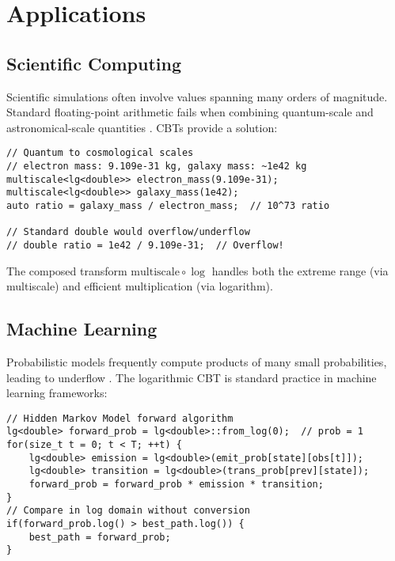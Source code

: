 \documentclass[12pt,a4paper]{article}
\theoremstyle{definition}
\begin{document}
\section{Applications}

\subsection{Scientific Computing}

Scientific simulations often involve values spanning many orders of magnitude. Standard floating-point arithmetic fails when combining quantum-scale and astronomical-scale quantities \cite{goldberg1991every}. CBTs provide a solution:

\begin{lstlisting}[caption={Multi-scale physics simulation using composed CBTs}]
// Quantum to cosmological scales  
// electron mass: 9.109e-31 kg, galaxy mass: ~1e42 kg
multiscale<lg<double>> electron_mass(9.109e-31);
multiscale<lg<double>> galaxy_mass(1e42);
auto ratio = galaxy_mass / electron_mass;  // 10^73 ratio

// Standard double would overflow/underflow
// double ratio = 1e42 / 9.109e-31;  // Overflow!
\end{lstlisting}

The composed transform $\text{multiscale} \circ \log$ handles both the extreme range (via multiscale) and efficient multiplication (via logarithm).

\subsection{Machine Learning}

Probabilistic models frequently compute products of many small probabilities, leading to underflow \cite{bishop2006pattern}. The logarithmic CBT is standard practice in machine learning frameworks:

\begin{lstlisting}[caption={Stable probability computation in log domain}]
// Hidden Markov Model forward algorithm
lg<double> forward_prob = lg<double>::from_log(0);  // prob = 1
for(size_t t = 0; t < T; ++t) {
    lg<double> emission = lg<double>(emit_prob[state][obs[t]]);
    lg<double> transition = lg<double>(trans_prob[prev][state]);
    forward_prob = forward_prob * emission * transition;
}
// Compare in log domain without conversion
if(forward_prob.log() > best_path.log()) {
    best_path = forward_prob;
}
\end{lstlisting}
\end{document}
